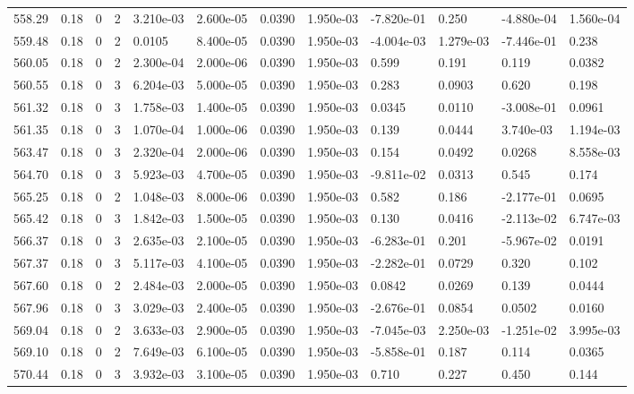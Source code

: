 \documentclass[preview]{standalone}
\begin{document}
{{{{{{{{{{{{{{{{{\begin{tabular}{L{1.2cm}C{1.2cm} C{0.3cm}C{0.5cm} C{1.4cm}C{1.4cm} C{1.4cm}C{1.4cm} C{1.6cm}C{1.6cm} C{1.6cm}C{1.6cm}}
  558.29  &  0.18  & 0     &  2 &  3.210e-03  & 2.600e-05  &  0.0390&   1.950e-03& -7.820e-01 & 0.250   &  -4.880e-04 & 1.560e-04  \\ 
  559.48  &  0.18  & 0     &  2 &  0.0105  & 8.400e-05  &  0.0390&   1.950e-03& -4.004e-03 & 1.279e-03   &  -7.446e-01 & 0.238  \\ 
  560.05  &  0.18  & 0     &  2 &  2.300e-04  & 2.000e-06  &  0.0390&   1.950e-03& 0.599 & 0.191   &  0.119 & 0.0382  \\ 
  560.55  &  0.18  & 0     &  3 &  6.204e-03  & 5.000e-05  &  0.0390&   1.950e-03& 0.283 & 0.0903   &  0.620 & 0.198  \\ 
  561.32  &  0.18  & 0     &  3 &  1.758e-03  & 1.400e-05  &  0.0390&   1.950e-03& 0.0345 & 0.0110   &  -3.008e-01 & 0.0961  \\ 
  561.35  &  0.18  & 0     &  3 &  1.070e-04  & 1.000e-06  &  0.0390&   1.950e-03& 0.139 & 0.0444   &  3.740e-03 & 1.194e-03  \\ 
  563.47  &  0.18  & 0     &  3 &  2.320e-04  & 2.000e-06  &  0.0390&   1.950e-03& 0.154 & 0.0492   &  0.0268 & 8.558e-03  \\ 
  564.70  &  0.18  & 0     &  3 &  5.923e-03  & 4.700e-05  &  0.0390&   1.950e-03& -9.811e-02 & 0.0313   &  0.545 & 0.174  \\ 
  565.25  &  0.18  & 0     &  2 &  1.048e-03  & 8.000e-06  &  0.0390&   1.950e-03& 0.582 & 0.186   &  -2.177e-01 & 0.0695  \\ 
  565.42  &  0.18  & 0     &  3 &  1.842e-03  & 1.500e-05  &  0.0390&   1.950e-03& 0.130 & 0.0416   &  -2.113e-02 & 6.747e-03  \\ 
  566.37  &  0.18  & 0     &  3 &  2.635e-03  & 2.100e-05  &  0.0390&   1.950e-03& -6.283e-01 & 0.201   &  -5.967e-02 & 0.0191  \\ 
  567.37  &  0.18  & 0     &  3 &  5.117e-03  & 4.100e-05  &  0.0390&   1.950e-03& -2.282e-01 & 0.0729   &  0.320 & 0.102  \\ 
  567.60  &  0.18  & 0     &  2 &  2.484e-03  & 2.000e-05  &  0.0390&   1.950e-03& 0.0842 & 0.0269   &  0.139 & 0.0444  \\ 
  567.96  &  0.18  & 0     &  3 &  3.029e-03  & 2.400e-05  &  0.0390&   1.950e-03& -2.676e-01 & 0.0854   &  0.0502 & 0.0160  \\ 
  569.04  &  0.18  & 0     &  2 &  3.633e-03  & 2.900e-05  &  0.0390&   1.950e-03& -7.045e-03 & 2.250e-03   &  -1.251e-02 & 3.995e-03  \\ 
  569.10  &  0.18  & 0     &  2 &  7.649e-03  & 6.100e-05  &  0.0390&   1.950e-03& -5.858e-01 & 0.187   &  0.114 & 0.0365  \\ 
  570.44  &  0.18  & 0     &  3 &  3.932e-03  & 3.100e-05  &  0.0390&   1.950e-03& 0.710 & 0.227   &  0.450 & 0.144  \\ 
\hline 
\end{tabular} 

}}}}}}}}}}}}}}}}}
\end{document}
